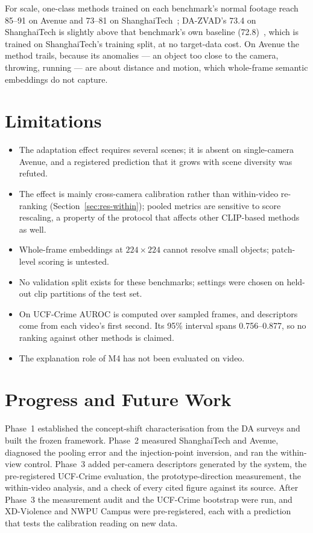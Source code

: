 \documentclass[conference]{IEEEtran}
\begin{document}
For scale, one-class methods trained on each benchmark's normal footage reach
85--91 on Avenue and 73--81 on ShanghaiTech~\cite{anyanomaly2025}; DA-ZVAD's
73.4 on ShanghaiTech is slightly above that benchmark's own baseline
(72.8)~\cite{liu2018shanghaitech}, which is trained on ShanghaiTech's training
split, at no target-data cost. On Avenue
the method trails, because its anomalies --- an object too close to the camera,
throwing, running --- are about distance and motion, which whole-frame semantic
embeddings do not capture.

\section{Limitations}
\begin{itemize}
  \item The adaptation effect requires several scenes; it is absent on
        single-camera Avenue, and a registered prediction that it grows with
        scene diversity was refuted.
  \item The effect is mainly cross-camera calibration rather than within-video
        re-ranking (Section~\ref{sec:res-within}); pooled metrics are sensitive
        to score rescaling, a property of the protocol that affects other
        CLIP-based methods as well.
  \item Whole-frame embeddings at $224\times224$ cannot resolve small objects;
        patch-level scoring is untested.
  \item No validation split exists for these benchmarks; settings were chosen on
        held-out clip partitions of the test set.
  \item On UCF-Crime AUROC is computed over sampled frames, and descriptors come
        from each video's first second. Its 95\% interval spans 0.756--0.877,
        so no ranking against other methods is claimed.
  \item The explanation role of M4 has not been evaluated on video.
\end{itemize}

\section{Progress and Future Work}

Phase~1 established the concept-shift characterisation from the DA surveys and
built the frozen framework. Phase~2 measured ShanghaiTech and Avenue, diagnosed
the pooling error and the injection-point inversion, and ran the within-view
control. Phase~3 added per-camera descriptors generated by the system, the
pre-registered UCF-Crime evaluation, the prototype-direction measurement, the
within-video analysis, and a check of every cited figure against its source.
After Phase~3 the measurement audit and the UCF-Crime bootstrap were run, and
XD-Violence and NWPU Campus were pre-registered, each with a prediction that
tests the calibration reading on new data.
\end{document}
